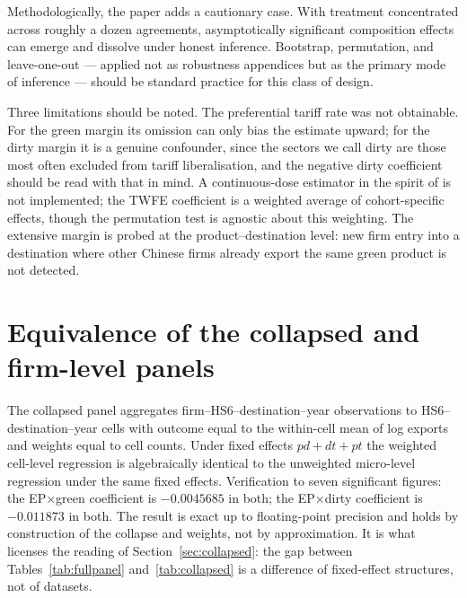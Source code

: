 \documentclass[12pt]{article}
\begin{document}
Methodologically, the paper adds a cautionary case. With treatment concentrated across
roughly a dozen agreements, asymptotically significant composition effects can emerge and
dissolve under honest inference. Bootstrap, permutation, and leave-one-out --- applied not
as robustness appendices but as the primary mode of inference --- should be standard
practice for this class of design.

Three limitations should be noted. The preferential tariff rate was not obtainable. For the green margin its omission can only bias the estimate upward; for the dirty margin it is a genuine confounder, since the sectors we call dirty are those most often excluded from tariff liberalisation, and the negative dirty coefficient should be read with that in mind.
A continuous-dose estimator in the spirit of \citet{callaway2024} is not implemented; the
TWFE coefficient is a weighted average of cohort-specific effects, though the permutation
test is agnostic about this weighting. The extensive margin is probed at the
product--destination level: new firm entry into a destination where other Chinese firms
already export the same green product is not detected.

\printbibliography

\appendix

\section{Equivalence of the collapsed and firm-level panels}\label{app:pddt}

The collapsed panel aggregates firm--HS6--destination--year observations to
HS6--destination--year cells with outcome equal to the within-cell mean of log exports
and weights equal to cell counts. Under fixed effects $pd + dt + pt$ the weighted
cell-level regression is algebraically identical to the unweighted micro-level regression
under the same fixed effects. Verification to seven significant figures: the
EP$\times$green coefficient is $-0.0045685$ in both; the EP$\times$dirty coefficient is
$-0.011873$ in both. The result is exact up to floating-point precision and holds by
construction of the collapse and weights, not by approximation. It is what licenses the
reading of Section~\ref{sec:collapsed}: the gap between Tables~\ref{tab:fullpanel}
and~\ref{tab:collapsed} is a difference of fixed-effect structures, not of datasets.
\end{document}
